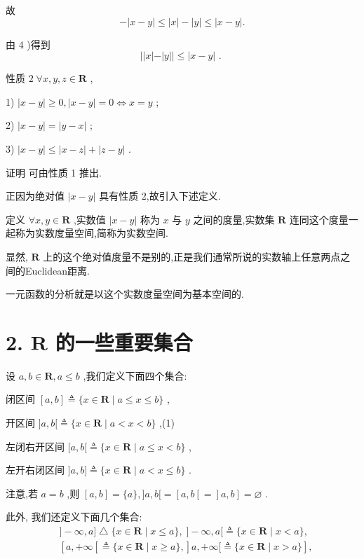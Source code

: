 故
$$- \left| {x - y}\right|  \leq  \left| x\right|  - \left| y\right|  \leq  \left| {x - y}\right| .$$

由 4 )得到
$$\left| \right| x\left| -\right| y\left| \right|  \leq  \left| {x - y}\right| \text{ . }$$

性质 $2\;\forall x,y,z \in  \mathbf{R}$ ,

1) $\left| {x - y}\right|  \geq  0,\left| {x - y}\right|  = 0 \Leftrightarrow  x = y$ ;

2) $\left| {x - y}\right|  = \left| {y - x}\right|$ ;

3) $\left| {x - y}\right|  \leq  \left| {x - z}\right|  + \left| {z - y}\right|$ .

证明 可由性质 1 推出.

正因为绝对值 $\left| {x - y}\right|$ 具有性质 2,故引入下述定义.

定义 $\forall x,y \in  \mathbf{R}$ ,实数值 $\left| {x - y}\right|$ 称为 $x$ 与 $y$ 之间的度量,实数集 $\mathbf{R}$ 连同这个度量一起称为实数度量空间,简称为实数空间.

显然, $\mathbf{R}$ 上的这个绝对值度量不是别的,正是我们通常所说的实数轴上任意两点之间的Euclidean距离.

一元函数的分析就是以这个实数度量空间为基本空间的.

\section*{2. $\mathbf{R}$ 的一些重要集合}

设 $a,b \in  \mathbf{R},a \leq  b$ ,我们定义下面四个集合:

闭区间 $\left\lbrack  {a,b}\right\rbrack   \triangleq  \{ x \in  \mathbf{R} \mid  a \leq  x \leq  b\}$ ,

开区间 $\rbrack a,b\lbrack  \triangleq  \{ x \in  \mathbf{R} \mid  a < x < b\}$ ,(1)

左闭右开区间 $\lbrack a,b\lbrack  \triangleq  \{ x \in  \mathbf{R} \mid  a \leq  x < b\}$ ,

左开右闭区间 $\rbrack a,b\rbrack  \triangleq  \{ x \in  \mathbf{R} \mid  a < x \leq  b\}$ .

注意,若 $a = b$ ,则 $\left\lbrack  {a,b}\right\rbrack   = \{ a\} ,\rbrack a,b\lbrack  = \left\lbrack  {a,b\left\lbrack   = \right\rbrack  a,b}\right\rbrack   = \varnothing$ .

此外, 我们还定义下面几个集合:
\begin{align*}
	&\rbrack  - \infty ,a\rbrack  \bigtriangleup  \{ x \in  \mathbf{R} \mid  x \leq  a\} ,\;\rbrack  - \infty ,a\lbrack  \triangleq  \{ x \in  \mathbf{R} \mid  x < a\} ,\\
	&\left\lbrack  {a, + \infty \left\lbrack  { \triangleq  \{ x \in  \mathbf{R} \mid  x \geq  a\} ,}\right\rbrack  a, + \infty \lbrack  \triangleq  \{ x \in  \mathbf{R} \mid  x > a\} }\right\rbrack  ,
\end{align*}

